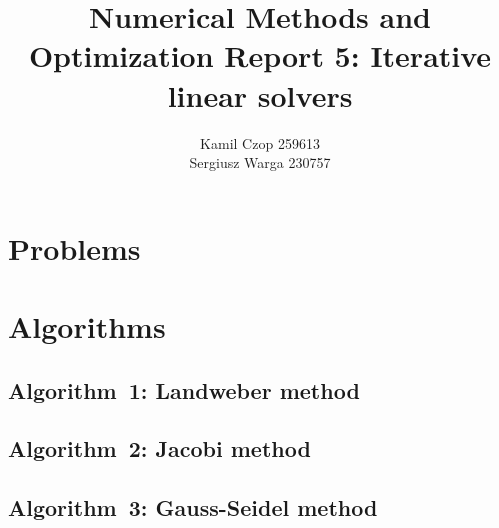\documentclass[a4paper]{article}
\title{Numerical Methods and Optimization Report 5:
Iterative linear solvers}
\author{Kamil Czop 259613\\Sergiusz Warga 230757}
\begin{document}
\maketitle
\tableofcontents
\listoftodos
\pagebreak

\section{Problems}



\clearpage

\section{Algorithms}%
\label{sec:algorithms}
\subsection{Algorithm~1: Landweber method}%
\label{algorithm:1}

\subsection{Algorithm~2: Jacobi method}%
\label{algorithm:2}
% 
\subsection{Algorithm~3: Gauss-Seidel method}%
\label{algorithm:3}

% 
% 




\clearpage

\nocite{Zdunek, GoluVanl96, Meyer}


\end{document}
